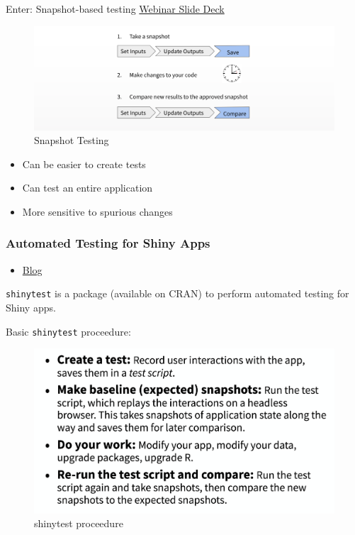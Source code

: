 \documentclass[]{book}
\providecommand{\tightlist}{%
  \setlength{\itemsep}{0pt}\setlength{\parskip}{0pt}}
\theoremstyle{definition}
\theoremstyle{definition}
\theoremstyle{definition}
\theoremstyle{remark}
\begin{document}
Enter: Snapshot-based testing
\href{https://github.com/rstudio/webinars/blob/master/48-shinytest/shinytest.pdf}{Webinar
Slide Deck}

\begin{figure}
\centering
\includegraphics{imgs/testing/snapshot-testing.png}
\caption{Snapshot Testing}
\end{figure}

\begin{itemize}
\tightlist
\item
  Can be easier to create tests
\item
  Can test an entire application
\item
  More sensitive to spurious changes
\end{itemize}

\hypertarget{automated-testing-for-shiny-apps}{%
\subsubsection{Automated Testing for Shiny
Apps}\label{automated-testing-for-shiny-apps}}

\begin{itemize}
\tightlist
\item
  \href{https://resources.rstudio.com/rstudio-blog/shinytest-automated-testing-for-shiny-apps}{Blog}
\end{itemize}

\texttt{shinytest} is a package (available on CRAN) to perform automated
testing for Shiny apps.

Basic \texttt{shinytest} proceedure:

\begin{figure}
\centering
\includegraphics{imgs/testing/testing-proceedure.png}
\caption{shinytest proceedure}
\end{figure}
\end{document}
